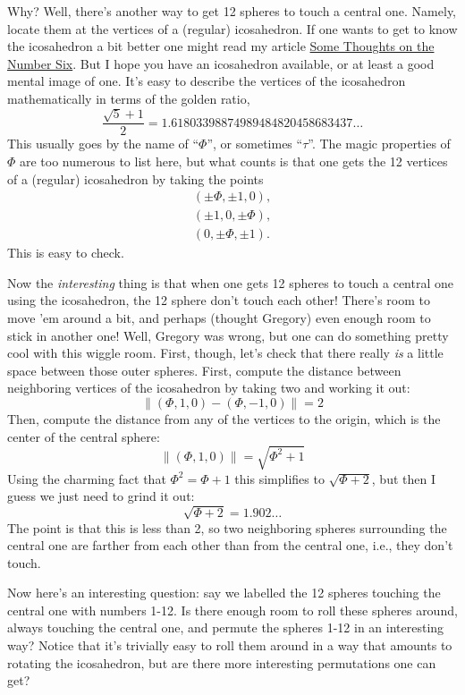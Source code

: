 \documentclass{article}
\begin{document}
Why? Well, there's another way to get 12 spheres to touch a central one.
Namely, locate them at the vertices of a (regular) icosahedron. If one
wants to get to know the icosahedron a bit better one might read my
article \href{http://math.ucr.edu/home/baez/six.html}{Some Thoughts on
the Number Six}. But I hope you have an icosahedron available, or at
least a good mental image of one. It's easy to describe the vertices of
the icosahedron mathematically in terms of the golden ratio,
\[\frac{\sqrt{5} + 1}{2} = 1.61803398874989484820458683437\ldots\] This
usually goes by the name of ``\(\Phi\)'', or sometimes ``\(\tau\)''. The magic properties
of \(\Phi\) are too numerous to list here, but what counts is that one gets
the 12 vertices of a (regular) icosahedron by taking the points \[
  \begin{gathered}
    (\pm \Phi, \pm1, 0),
  \\(\pm1, 0, \pm \Phi),
  \\(0, \pm \Phi, \pm1).
  \end{gathered}
\] This is easy to check.

Now the \emph{interesting} thing is that when one gets 12 spheres to
touch a central one using the icosahedron, the 12 sphere don't touch
each other! There's room to move 'em around a bit, and perhaps (thought
Gregory) even enough room to stick in another one! Well, Gregory was
wrong, but one can do something pretty cool with this wiggle room.
First, though, let's check that there really \emph{is} a little space
between those outer spheres. First, compute the distance between
neighboring vertices of the icosahedron by taking two and working it
out: 
\[\|(\Phi,1,0) -(\Phi,-1,0)\| = 2\] 
Then, compute the distance from any
of the vertices to the origin, which is the center of the central
sphere: 
\[\|(\Phi,1,0)\| = \sqrt{\Phi^2 + 1}\] 
Using the charming fact that
\(\Phi^2 = \Phi + 1\) this simplifies to \(\sqrt{\Phi + 2}\), but then I guess we
just need to grind it out: 
\[\sqrt{\Phi + 2} =  1.902\ldots\] 
The point is
that this is less than 2, so two neighboring spheres surrounding the
central one are farther from each other than from the central one, i.e.,
they don't touch.

Now here's an interesting question: say we labelled the 12 spheres
touching the central one with numbers 1-12. Is there enough room to roll
these spheres around, always touching the central one, and permute the
spheres 1-12 in an interesting way? Notice that it's trivially easy to
roll them around in a way that amounts to rotating the icosahedron, but
are there more interesting permutations one can get?
\end{document}
